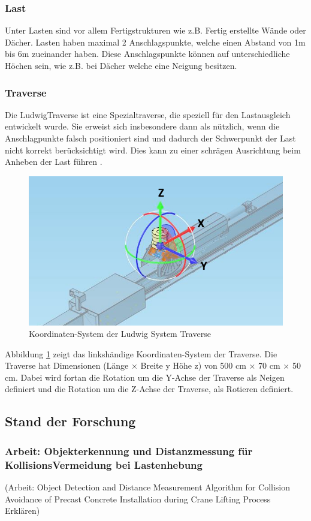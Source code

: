 \subsubsection{Last}
Unter Lasten sind vor allem Fertigstrukturen wie z.B. Fertig erstellte Wände oder Dächer. Lasten haben maximal 2 Anschlagspunkte, welche einen Abstand von 1m bis 6m zueinander haben. Diese Anschlagspunkte können auf unterschiedliche Höchen sein, wie z.B. bei Dächer welche eine Neigung besitzen.


\clearpage
\subsubsection{Traverse}
Die LudwigTraverse ist eine Spezialtraverse, die speziell für den Lastausgleich entwickelt 
wurde. Sie erweist sich insbesondere dann als nützlich, wenn die Anschlagpunkte 
falsch positioniert sind und dadurch der Schwerpunkt der Last nicht korrekt berücksichtigt wird. 
Dies kann zu einer schrägen Ausrichtung beim Anheben der Last führen \cite{ludwigTraverse}.

\begin{figure}[H]
    \centering
    \includegraphics[width=0.5\linewidth]{graphics/Traverse_Rotationen.PNG}
    \caption{Koordinaten-System der Ludwig System Traverse}
    \label{fig:traverse}
\end{figure}

Abbildung \ref{fig:traverse} zeigt das linkshändige Koordinaten-System der Traverse.
Die Traverse hat Dimensionen (Länge × Breite y Höhe z) von 500 cm × 70 cm × 50 cm.
Dabei wird fortan die Rotation um die Y-Achse der Traverse als Neigen definiert und die Rotation 
um die Z-Achse der Traverse, als Rotieren definiert.


\subsection{Stand der Forschung}

\subsubsection{Arbeit: Objekterkennung und Distanzmessung für KollisionsVermeidung bei Lastenhebung}
(Arbeit: Object Detection and Distance Measurement Algorithm for Collision Avoidance of Precast Concrete Installation during Crane Lifting Process\cite{yong_object_2023} Erklären)

